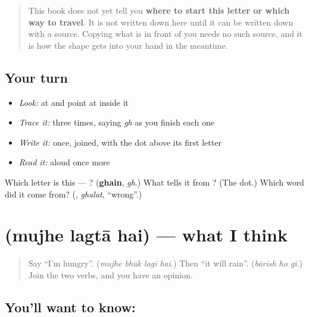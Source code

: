 \begin{quote}
This book does not yet tell you \textbf{where to start this letter or which way to travel}. It is not written down here until it can be written down with a source. Copying what is in front of you needs no such source, and it is how the shape gets into your hand in the meantime.
\end{quote}

\subsection*{Your turn}
\begin{itemize}
\raggedright
  \item \emph{Look:} at \textbf{} and point at  inside it
  \item \emph{Trace it:}  three times, saying \emph{gh} as you finish each one
  \item \emph{Write it:} \textbf{} once, joined, with the dot above its first letter
  \item \emph{Read it:} \textbf{} aloud once more
\end{itemize}

\begin{tcolorbox}[breakable,colback=teal!4,colframe=teal!35!black,title={Before you move on}]
Which letter is this — ? (\textbf{ghain}, \emph{gh}.) What tells it from ? (The dot.) Which word did it come from? (\textbf{}, \emph{ghalat}, \textquotedblleft{}wrong\textquotedblright{}.)
\end{tcolorbox}
\section[\texorpdfstring{\ur{مجھے} \ur{لگتا} \ur{ہے} (mujhe lagtā hai)}{مجھے لگتا ہے (mujhe lagtā hai)}]{   (mujhe lagtā hai) — what I think}

\label{lesson:UR-C268-mujhe-lagta-hai}



\begin{quote}
Say \textquotedblleft{}I'm hungry\textquotedblright{}. (\emph{mujhe bhūk lagī hai}.) Then \textquotedblleft{}it will rain\textquotedblright{}. (\emph{bārish ho gī}.) Join the two verbs, and you have an opinion.
\end{quote}

\subsection*{You'll want to know:    }
\begin{quote}
\textbf{  }
\end{quote}

